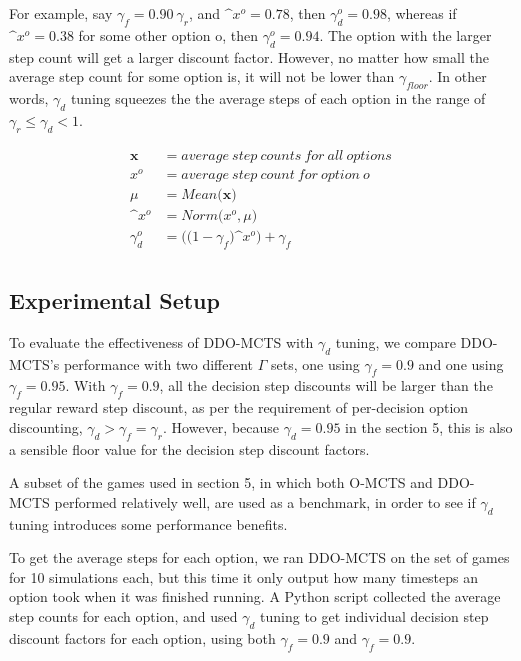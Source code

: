 \documentclass[12pt,a4paper]{article}
\begin{document}
\begin{multicols}{2}
For example, say $\gamma_{f} = 0.90\  \gamma_{r}$, and $\^{x}^o = 0.78$, then $\gamma^o_{d} = 0.98$, whereas if $\^{x}^o = 0.38$ for some other option o, then $\gamma^o_{d} = 0.94$. The option with the larger step count will get a larger discount factor. However, no matter how small the average step count for some option is, it will not be lower than $\gamma_{floor}$. In other words, $\gamma_d$ tuning squeezes the the average steps of each option in the range of $\gamma_r \leq \gamma_d < 1$.

\begin{equation}
    \begin{align*}
        \mathbf{x} & = average\ step\ counts\ for\ all\ options \\
        x^o &  = average\ step\ count\ for\ option\ o \\
        \mu & = Mean\big(\mathbf{x}\big) \\
        \^{x^o} & = Norm\big(x^o, \mu\big) \\
        \gamma^o_{d} & = \big(\big(1-\gamma_{f}\big)\^{x^o}\big) + \gamma_{f} \\
    \end{align*}
    \label{eq:gamma-tuning}
\end{equation}

\subsection{Experimental Setup}
To evaluate the effectiveness of DDO-MCTS with $\gamma_{d}$ tuning, we compare DDO-MCTS's performance with two different $\Gamma$ sets, one using $\gamma_{f} = 0.9$ and one using $\gamma_{f} = 0.95$. With $\gamma_f = 0.9$, all the decision step discounts will be larger than the regular reward step discount, as per the requirement of per-decision option discounting, $\gamma_d > \gamma_f = \gamma_r$. However, because $\gamma_d = 0.95$ in the section 5, this is also a sensible floor value for the decision step discount factors.

A subset of the games used in section 5, in which both O-MCTS and DDO-MCTS performed relatively well, are used as a benchmark, in order to see if $\gamma_{d}$ tuning introduces some performance benefits. 

To get the average steps for each option, we ran DDO-MCTS on the set of games for 10 simulations each, but this time it only output how many timesteps an option took when it was finished running. A Python script collected the average step counts for each option, and used $\gamma_{d}$ tuning to get individual decision step discount factors for each option, using both $\gamma_f = 0.9$ and $\gamma_f = 0.9$.


\end{multicols}
\end{document}
